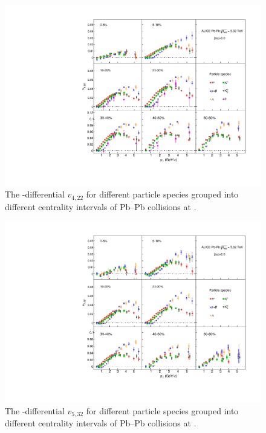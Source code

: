 \begin{figure}[!htb]
\begin{center}
\includegraphics[scale=0.82]{figures/results/All_v422_gap00_PID2_3by3.pdf}
\end{center}
\caption{The \pT-differential $v_{4,22}$ for different particle species grouped into different centrality intervals of Pb--Pb collisions at \sNN.}
\label{v422_particleDependence}
\end{figure}

\begin{figure}[!htb]
\begin{center}
\includegraphics[scale=0.82]{figures/results/All_v523_gap00_PID2_3by3.pdf}

\end{center}
\caption{The \pT-differential $v_{5,32}$ for different particle species grouped into different centrality intervals of Pb--Pb collisions at \sNN.}
\label{v523_particleDependence}
\end{figure}

